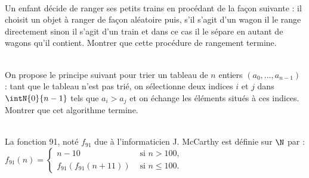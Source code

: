 \documentclass[11pt,a4paper]{article}
\begin{document}
\begin{Exercise}[title = {Rangements de petits trains}]\\
    Un enfant décide de ranger ses petits trains en procédant de la façon suivante : il choisit un objet à ranger de façon aléatoire puis, s'il s'agit d'un wagon il le range directement sinon il s'agit d'un train et dans ce cas il le sépare en autant de wagons qu'il contient. Montrer que cette procédure de rangement termine.
\end{Exercise}

\begin{Exercise}[title = {Tri par épuisement des inversions}]\\
    On propose le principe suivant pour trier un tableau de $n$ entiers $(a_0, \dots, a_{n-1})$ : tant que le tableau n'est pas trié, on sélectionne deux indices $i$ et $j$ dans $\intN{0}{n-1}$ tels que $a_i > a_j$ et on échange les éléments situés à ces indices.
    Montrer que cet algorithme termine.
\end{Exercise}

\begin{Exercise}[title={Fonction 91}]\\
    La fonction 91, noté $f_{91}$ due à l'informaticien J. McCarthy est définie sur $\N$ par : \\
    $f_{91}(n) = \left\{
        \begin{array}{lr}
            n-10 & \text{ si } n>100, \\
            f_{91}(f_{91}(n+11))  & \text{ si } n \leq 100.
        \end{array}
    \right.$
\end{Exercise}
\end{document}
